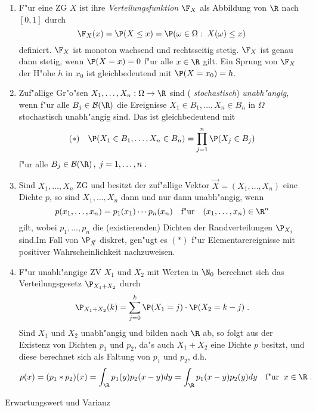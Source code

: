 \begin{enumerate}
{stetig} f"ur $\P_X$ mit Dichte $p$ ($p$ hei"st auch {\it
Verteilungsdichte} von $X$).
\item
F"ur eine ZG $X$ ist ihre {\it Verteilungsfunktion} $\F_X$ als
Abbildung von $\R$ nach $[0,1]$ durch
\[\F_X(x)=\P(X\le x)=\P(\omega\in\Omega:\;X(\omega)\le x)\]
definiert. $\F_X$ ist monoton wachsend und rechtsseitig stetig.
$\F_X$ ist genau dann stetig, wenn $\P(X=x)=0$ f"ur alle $x\in\R$
gilt. Ein Sprung von $\F_X$ der H"ohe $h$ in $x_0$ ist
gleichbedeutend mit $\P(X=x_0)=h$.
\item
Zuf"allige Gr"o"sen $X_1,\ldots,X_n:\Omega\to\R$ sind ({\it
stochastisch}) {\it unabh"angig}, wenn f"ur alle $B_j\in\fr B(\R)$
die Ereignisse $X_1\in B_1,\ldots,X_n\in B_n$ in $\Omega$
stochastisch unabh"angig sind. Das ist gleichbedeutend mit
\[ (\ast)\quad \P(X_1\in B_1,\ldots,X_n\in B_n)=\prod_{j=1}^n\P(X_j\in
B_j)\] f"ur alle $B_j\in\fr B(\R)\,,\;j=1,\ldots,n\;.$
\item
Sind $X_1,\ldots,X_n$ ZG und besitzt der zuf"allige Vektor $\vec
X=(X_1,\ldots,X_n)$ eine Dichte $p$, so sind $X_1,\ldots,X_n$ dann
und nur dann unabh"angig, wenn
\[p(x_1,\ldots,x_n)=p_1(x_1)\cdots p_n(x_n)\quad\mbox{f"ur}\quad
(x_1,\ldots,x_n)\in\R^n\] gilt, wobei $p_1,\ldots,p_n$ die
(existierenden) Dichten der Randverteilungen $\P_{X_j}$
sind.\newline Im Fall von $\P_{\vec X}$ diskret, gen"ugt es $(\ast)$
f"ur Elementarereignisse mit positiver Wahrscheinlichkeit
nachzuweisen.
\item
F"ur unabh"angige ZV $X_1$ und $X_2$ mit Werten in $\N_0$ berechnet
sich das Verteilungsgesetz $\P_{X_1+X_2}$ durch
\[\P_{X_1+X_2}(k)=\sum_{j=0}^k \P(X_1=j)\cdot\P(X_2=k-j)
\;.\] Sind $X_1$ und $X_2$ unabh"angig und bilden nach $\R$ ab, so
folgt aus der Existenz von Dichten $p_1$ und $p_2$, da"s auch
$X_1+X_2$ eine Dichte $p$ besitzt, und diese berechnet sich als
Faltung von $p_1$ und $p_2$, d.h.
\[p(x)=(p_1\ast p_2)(x)=\int_{\R}p_1(y) p_2(x-y)dy=
\int_{\R}p_1(x-y)p_2(y)dy\quad\mbox{f"ur}\;\;x\in\R\;.\]
\end{enumerate}
\item
{\large Erwartungswert und Varianz}
